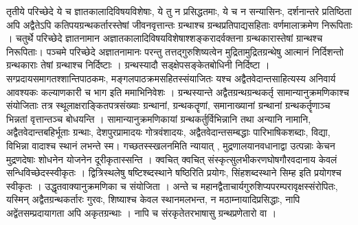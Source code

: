 तृतीये परिच्छेदे ये च ज्ञातकालादिविषयविशेषाः, ये तु न प्रसिद्धतमाः, ये च न सन्यासिनः, दर्शनान्तरे प्रतिष्ठिता अपि अद्वैतेऽपि कतिपयग्रन्थकर्तारस्तेषां जीवनवृत्तान्तः ग्रन्थाश्च ग्रन्थप्रतिपाद्यसहिताः वर्णमालाक्रमेण निरूपिताः । 
चतुर्थे परिच्छेदे ज्ञातनामान अज्ञातकालादिविषयविशेषाश्शङ्करादर्वक्तना ग्रन्थकारास्तेषां ग्रान्थश्च निरूपिताः। पञ्चमे परिच्छेदे अज्ञातनामानः परन्तु तत्तद्गुरुशिष्यत्वेन मुद्रितामुद्रितग्रन्थेषु आत्मानं निर्दिशन्तो ग्रन्थकाराः तेषां ग्रन्थाश्च निर्दिष्टाः । 
ग्रन्थस्यादौ सड्क्षेपसङ्केतबोधिनी निर्दिष्टा । सग्प्रदायसमागतश्शान्तिपाठकमः, मङ्गलपाठक्रमसहितस्संयाजितः यश्च अद्वैतवेदान्तसाहित्यस्य अनिवार्य आवश्यकः कल्याणकारी च भाग इति ममाभिनिवेशः । ग्रन्थस्यान्ते अद्वैतग्रन्थग्रन्थकर्तृ सामान्यानुक्रमणिकाश्च संयोजिताः तत्र स्थूलाक्षराङ्कितपत्रसंख्याः ग्रन्थानां, ग्रन्थकतॄणां, समानाख्यानां ग्रन्थानां ग्रन्थकर्तॄणाञ्च भिन्नतां वृत्तान्तञ्च बोधयन्ति । सामान्यानुक्रमणिकायां ग्रन्थकर्तुर्विभिन्नानि तथा अन्यानि नामानि, अद्वैतवेदान्तबहिर्भूताः ग्रन्थाः, देशपुरप्रामादयः गोत्रवंशादयः, अद्वैतवेदान्तसम्बद्धाः पारिभाषिकशब्दाः, विद्या, विभिन्ना वादाश्च स्थानं लभन्ते स्म। गच्छतस्स्खलनमिति न्यायात् , मुद्रणालयानवधानाद्वा उत्पन्नाः केचन मुद्रणदेषाः शोधनेन योजनेन दूरीकृतास्सन्ति । क्वचित् क्वचित्  संस्कृत्सुलभीकरणघोषगौरवदानाय केवलं सन्धिविच्छेदस्स्वीकृतः । द्वित्रिस्थलेषु षष्टिश्ब्दस्थाने षष्ठिरिति प्रयोगः, सिंहशब्दस्थाने सिम्ह इति प्रयोगश्च स्वीकृतः । उद्धृतवाक्यानुक्रमणिका च संयोजिता । अन्ते च महानद्वैताचार्यगुरुशिप्यपरम्परावृक्षस्संरोपितः, यस्मिन् अद्वैतग्रन्थकर्तारः गुरवः, शिष्याश्च केवल स्थानमलभन्त, न मठाम्नायादिप्रसिद्धाः, नापि अद्वेंतसम्प्रदायागता अपि अकृतग्रन्थाः । नापि च संरकृतेतरभाषासु ग्रन्थप्रणेतारो वा । 

